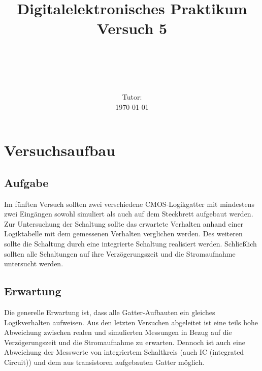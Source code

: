 \documentclass[11pt, a4paper]{article}
\title{\textbf{Digitalelektronisches Praktikum\\ Versuch 5}}
\author{\ATutantName \\ \emph{\ATutantEmail} \and \BTutantName\\ \emph{\BTutantEmail}}
\date{\Gruppennummer \\[3ex] Tutor: \Tutorname \\[3ex] \today}
\begin{document}
\clearpage
\maketitle
\thispagestyle{empty}
\newpage


\section*{Versuchsaufbau}
\subsection*{Aufgabe}
Im fünften Versuch sollten zwei verschiedene CMOS-Logikgatter mit mindestens zwei Eingängen sowohl simuliert als auch auf dem Steckbrett aufgebaut werden. Zur Untersuchung der Schaltung sollte das erwartete Verhalten anhand einer Logiktabelle mit dem gemessenen Verhalten verglichen werden. Des weiteren sollte die Schaltung durch eine integrierte Schaltung realisiert werden. Schließlich sollten alle Schaltungen auf ihre Verzögerungszeit und die Stromaufnahme untersucht werden.
\subsection*{Erwartung}
Die generelle Erwartung ist, dass alle Gatter-Aufbauten ein gleiches Logikverhalten aufweisen. Aus den letzten Versuchen abgeleitet ist eine teils hohe Abweichung zwischen realen und simulierten Messungen in Bezug auf die Verzögerungszeit und die Stromaufnahme zu erwarten. Dennoch ist auch eine Abweichung der Messwerte von integriertem Schaltkreis (auch IC (integrated Circuit)) und dem aus transistoren aufgebauten Gatter möglich.

\end{document}
